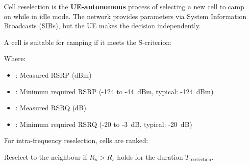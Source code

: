 Cell reselection is the \textbf{UE-autonomous} process of selecting a new cell to camp on while in idle mode. The network provides parameters via System Information Broadcasts (SIBs), but the UE makes the decision independently.



\CNchained{}

A cell is suitable for camping if it meets the S-criterion:


Where:

\begin{itemize}
\tightlist
\item
  : Measured RSRP (dBm)
\item
  : Minimum required RSRP (-124 to -44~dBm, typical: -124~dBm)
\item
  : Measured RSRQ (dB)
\item
  : Minimum required RSRQ (-20 to -3~dB, typical: -20~dB)
\end{itemize}


For intra-frequency reselection, cells are ranked:


Reselect to the neighbour if $R_n > R_s$ holds for the duration $T_{\mathrm{reselection}}$.



